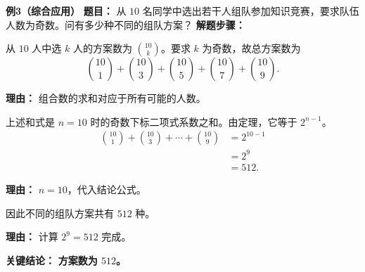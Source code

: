 \begin{examplebox}
	\medskip
	\textbf{\textcolor{CExample}{例3（综合应用）}}
	\textbf{\textcolor{CExample}{题目：}}
	从 $10$ 名同学中选出若干人组队参加知识竞赛，要求队伍人数为奇数。问有多少种不同的组队方案？
	\textbf{\textcolor{CExample}{解题步骤：}}
	\begin{description}[style=nextline, leftmargin=2.8em, labelsep=0.5em, itemsep=0.45em]
		\item[\textbf{第一步（转化为组合和式）：}]
			从 $10$ 人中选 $k$ 人的方案数为 $\binom{10}{k}$。要求 $k$ 为奇数，故总方案数为
			\[
				\binom{10}{1}+\binom{10}{3}+\binom{10}{5}+\binom{10}{7}+\binom{10}{9}.
			\]
			\par\textbf{理由：} 组合数的求和对应于所有可能的人数。
		\item[\textbf{第二步（套用结论）：}]
			上述和式是 $n=10$ 时的奇数下标二项式系数之和。由定理，它等于 $2^{n-1}$。
			\[
				\begin{aligned}
					\binom{10}{1}+\binom{10}{3}+\cdots+\binom{10}{9} &= 2^{10-1} \\ &= 2^{9} \\ &= 512.
			\end{aligned}
			\]
			\par\textbf{理由：} $n=10$，代入结论公式。
		\item[\textbf{第三步（给出答案）：}]
			因此不同的组队方案共有 $512$ 种。
			\par\textbf{理由：} 计算 $2^{9}=512$ 完成。
	\end{description}
	\textbf{\textcolor{CExample}{关键结论：}}
	\textbf{方案数为 $512$。}
\end{examplebox}
